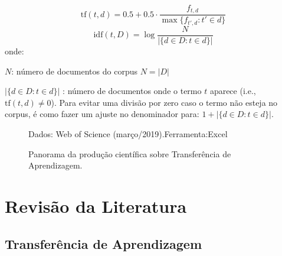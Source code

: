 \documentclass[sigconf]{acmart}
\newcommand{\source}[2]{\raggedleft{}\vspace*{-7mm}\caption*{ \textmd{\scriptsize{Dados: {#1}.\hfill Ferramenta:{#2}}}}}
\begin{document}
\begin{enumerate}[a)]
{\begin{equation}
    \mathrm{tf}(t,d) = 0.5 + 0.5 \cdot  \frac{f_{t, d}}{\max\{f_{t', d}:t' \in d\}}
  \end{equation}
  \begin{equation}
    \mathrm{idf}(t, D) =  \log \frac{N}{|\{d \in D: t \in d\}|}
  \end{equation}
  onde:
  \begin{description}
    \item $N$: número de documentos do corpus $N = {|D|}$
   \item$ |\{d \in D: t \in d\}| $ : número de documentos onde o termo  $ t $ aparece (i.e., $ \mathrm{tf}(t,d) \neq 0$). Para evitar uma divisão por zero caso o termo não esteja no corpus, é como fazer um ajuste no denominador para: $1 + |\{d \in D: t \in d\}|$.
   
   
  \end{description}
  }\label{analiseTextual}
\end{enumerate}


\begin{figure}[b]
  \centering
  \source{Web of Science (março/2019)}{Excel}
  \caption{Panorama da produção científica sobre Transferência de Aprendizagem.} \label{fig:toptop}
\end{figure}
\section{Revisão da Literatura}
  \subsection{Transferência de Aprendizagem}
  \lipsum[3]
\end{document}
